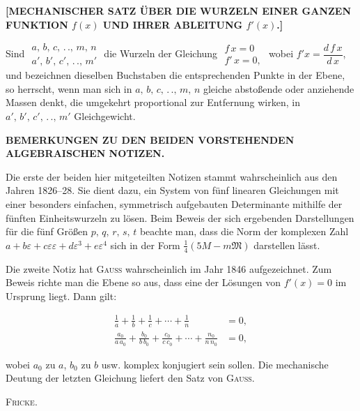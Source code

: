 \clearpage
{}

\begin{center}
\textbf{[MECHANISCHER SATZ ÜBER DIE WURZELN EINER GANZEN
FUNKTION $f(x)$ UND IHRER ABLEITUNG $f'(x)$.]}
\end{center}

\noindent\hspace*{\parindent}Sind $\begin{array}{c}a,\,b,\,c,\,.\,.,\,m,\,n\\ a',\,b',\,c',\,.\,.,\,m'\end{array}$ die
Wurzeln der Gleichung $\begin{array}{c}f\,x=0\\ f'\,x=0,\end{array}$ wobei $f'x=\dfrac{d\,f\,x}{d\,x}$,
und bezeichnen dieselben Buchstaben die entsprechenden Punkte in der Ebene, so herrscht, wenn
man sich in $a,\,b,\,c,\,.\,.,\,m,\,n$ gleiche abstoßende oder anziehende Massen denkt, die umgekehrt proportional
zur Entfernung wirken, in $a',\,b',\,c',\,.\,.,\,m'$ Gleichgewicht.

\begin{center}
\textbf{BEMERKUNGEN ZU DEN BEIDEN VORSTEHENDEN ALGEBRAISCHEN NOTIZEN.}
\end{center}

\noindent\hspace*{\parindent}Die erste der beiden hier mitgeteilten Notizen stammt wahrscheinlich aus den Jahren 1826--28. Sie
dient dazu, ein System von fünf linearen Gleichungen mit einer besonders einfachen, symmetrisch
aufgebauten Determinante mithilfe der fünften Einheitswurzeln zu lösen. Beim Beweis der
sich ergebenden Darstellungen für die fünf Größen $p,\,q,\,r,\,s,\,t$ beachte man,
dass die Norm der komplexen Zahl $a+b\varepsilon+c\varepsilon\varepsilon+d\varepsilon^3+e\varepsilon^4$
sich in der Form $\frac{1}{4}(5M-m\mathfrak{M})$ darstellen lässt. 

Die zweite Notiz hat \textsc{Gauss} wahrscheinlich im Jahr 1846 aufgezeichnet. Zum Beweis
richte man die Ebene so aus, dass eine der Lösungen von $f'(x)=0$ im Ursprung liegt.
Dann gilt:

\[
\begin{aligned}
\frac{1}{a}+\frac{1}{b}+\frac{1}{c}+\cdots+\frac{1}{n}&=0,\\[3pt]
\frac{a_0}{a\,a_0}+\frac{b_0}{b\,b_0}+\frac{c_0}{c\,c_0}+\cdots+\frac{n_0}{n\,n_0}&=0,
\end{aligned}
\]

\noindent wobei $a_0$ zu $a$, $b_0$ zu $b$ usw. komplex konjugiert sein sollen. Die mechanische Deutung der
letzten Gleichung liefert den Satz von \textsc{Gauss}.
\par\nobreak\hfill\textsc{Fricke.}\par

